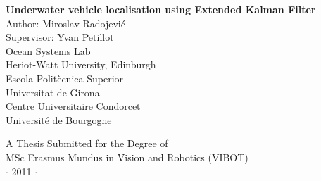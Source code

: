 
\newpage
\thispagestyle{empty}


\vspace*{2cm}
\begin{center}
{\Large\bf Underwater vehicle localisation using Extended Kalman Filter\\} \vspace{2cm} {\large
Author: Miroslav Radojevi\'c \\
Supervisor: Yvan Petillot    \\
\vspace{3cm}
Ocean Systems Lab \\
Heriot-Watt University, Edinburgh  \\
\vspace{0.5cm}
Escola Polit\`{e}cnica Superior \\
Universitat de Girona \\ 
\vspace{0.5cm}
Centre Universitaire Condorcet \\
Universit\'{e} de Bourgogne  
}

\end{center}

\vspace{3.5cm}
\begin{center}
{\large A Thesis Submitted for the Degree of \\MSc Erasmus Mundus
in Vision and Robotics (VIBOT) \\\vspace{0.3cm} $\cdot$ 2011
$\cdot$}
\end{center}
\singlespacing


